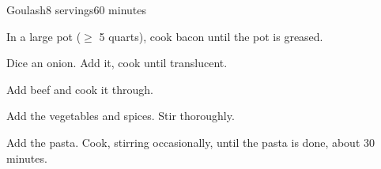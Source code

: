 \documentclass[../Cookbook.tex]{subfiles}
\begin{document}
\begin{recipe}{Goulash}{8 servings}{60 minutes}

In a large pot ($\ge$ 5 quarts),
cook bacon until the pot is greased.

Dice an onion.
Add it, cook until translucent.

Add beef and cook it through.

Add the vegetables and spices. Stir thoroughly.

Add the pasta. Cook, stirring occasionally, until the pasta is done, about 30 minutes.

\end{recipe}
\end{document}
